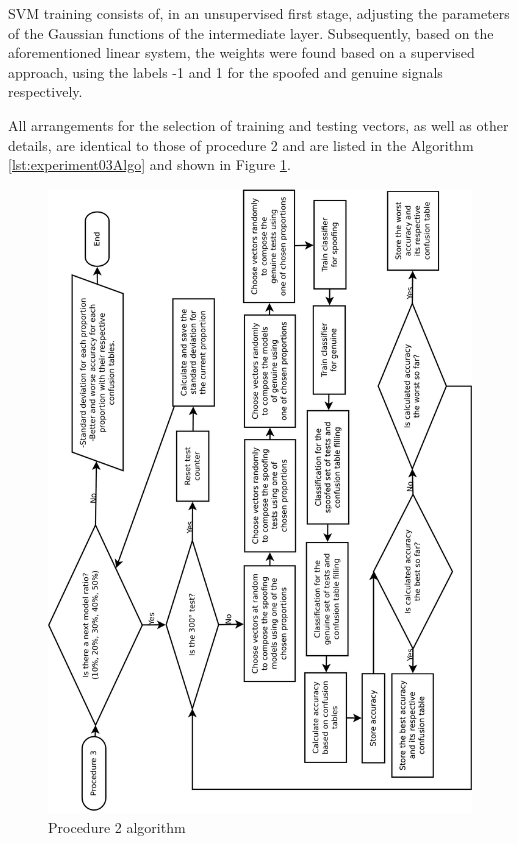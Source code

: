 			\par SVM training consists of, in an unsupervised first stage, adjusting the parameters of the Gaussian functions of the intermediate layer. Subsequently, based on the aforementioned linear system, the weights were found based on a supervised approach, using the labels -1 and 1 for the spoofed and genuine signals respectively. \\
			
			\par All arrangements for the selection of training and testing vectors, as well as other details, are identical to those of procedure 2 and are listed in the Algorithm \ref{lst:experiment03Algo} and shown in Figure \ref{fig:experiment03Algo}. \\
			
			
			
			\begin{figure}[H]
				\centering
				\includegraphics[angle=-90,width=1\linewidth]{images/AlgoProcedure03.pdf}
				\caption{Procedure 2 algorithm}
				\label{fig:experiment03Algo}
			\end{figure}
